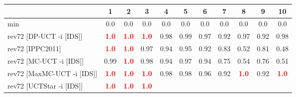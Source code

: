 \documentclass{article}
\begin{document}
\begin{tabular}{|l|r@{$\pm$}rr@{$\pm$}rr@{$\pm$}rr@{$\pm$}rr@{$\pm$}rr@{$\pm$}rr@{$\pm$}rr@{$\pm$}rr@{$\pm$}rr@{$\pm$}r|}
\hline

& \multicolumn{2}{c}{1}
& \multicolumn{2}{c}{2}
& \multicolumn{2}{c}{3}
& \multicolumn{2}{c}{4}
& \multicolumn{2}{c}{5}
& \multicolumn{2}{c}{6}
& \multicolumn{2}{c}{7}
& \multicolumn{2}{c}{8}
& \multicolumn{2}{c}{9}
& \multicolumn{2}{c|}{10}
\\
\hline
\hline
min
& \multicolumn{2}{c}{0.0}
& \multicolumn{2}{c}{0.0}
& \multicolumn{2}{c}{0.0}
& \multicolumn{2}{c}{0.0}
& \multicolumn{2}{c}{0.0}
& \multicolumn{2}{c}{0.0}
& \multicolumn{2}{c}{0.0}
& \multicolumn{2}{c}{0.0}
& \multicolumn{2}{c}{0.0}
& \multicolumn{2}{c|}{0.0}
\\
rev72 [DP-UCT -i [IDS]]
& \multicolumn{2}{c}{\textbf{\textcolor{red}{1.0}}}
& \multicolumn{2}{c}{\textbf{\textcolor{red}{1.0}}}
& \multicolumn{2}{c}{\textbf{\textcolor{red}{1.0}}}
& \multicolumn{2}{c}{0.98}
& \multicolumn{2}{c}{0.99}
& \multicolumn{2}{c}{0.97}
& \multicolumn{2}{c}{0.92}
& \multicolumn{2}{c}{0.97}
& \multicolumn{2}{c}{0.92}
& \multicolumn{2}{c|}{0.98}
\\
rev72 [IPPC2011]
& \multicolumn{2}{c}{\textbf{\textcolor{red}{1.0}}}
& \multicolumn{2}{c}{\textbf{\textcolor{red}{1.0}}}
& \multicolumn{2}{c}{0.97}
& \multicolumn{2}{c}{0.94}
& \multicolumn{2}{c}{0.95}
& \multicolumn{2}{c}{0.92}
& \multicolumn{2}{c}{0.83}
& \multicolumn{2}{c}{0.52}
& \multicolumn{2}{c}{0.81}
& \multicolumn{2}{c|}{0.48}
\\
rev72 [MC-UCT -i [IDS]]
& \multicolumn{2}{c}{0.99}
& \multicolumn{2}{c}{\textbf{\textcolor{red}{1.0}}}
& \multicolumn{2}{c}{0.98}
& \multicolumn{2}{c}{0.94}
& \multicolumn{2}{c}{0.97}
& \multicolumn{2}{c}{0.94}
& \multicolumn{2}{c}{0.75}
& \multicolumn{2}{c}{0.54}
& \multicolumn{2}{c}{0.76}
& \multicolumn{2}{c|}{0.51}
\\
rev72 [MaxMC-UCT -i [IDS]]
& \multicolumn{2}{c}{\textbf{\textcolor{red}{1.0}}}
& \multicolumn{2}{c}{\textbf{\textcolor{red}{1.0}}}
& \multicolumn{2}{c}{\textbf{\textcolor{red}{1.0}}}
& \multicolumn{2}{c}{0.98}
& \multicolumn{2}{c}{0.98}
& \multicolumn{2}{c}{0.96}
& \multicolumn{2}{c}{0.92}
& \multicolumn{2}{c}{\textbf{\textcolor{red}{1.0}}}
& \multicolumn{2}{c}{0.92}
& \multicolumn{2}{c|}{\textbf{\textcolor{red}{1.0}}}
\\
rev72 [UCTStar -i [IDS]]
& \multicolumn{2}{c}{\textbf{\textcolor{red}{1.0}}}
& \multicolumn{2}{c}{\textbf{\textcolor{red}{1.0}}}
& \multicolumn{2}{c}{\textbf{\textcolor{red}{1.0}}}

\end{tabular}
\end{document}
